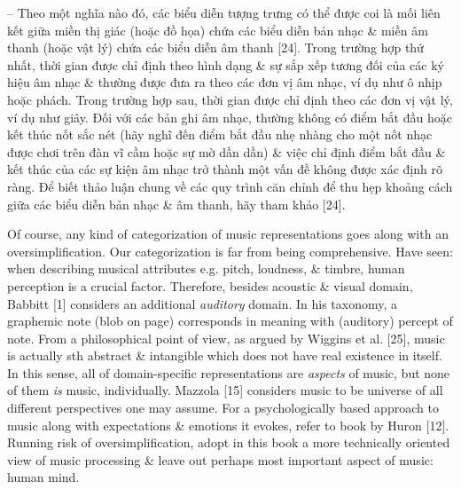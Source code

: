 \documentclass{article}
\begin{document}
\begin{itemize}
\begin{itemize}
		-- Theo một nghĩa nào đó, các biểu diễn tượng trưng có thể được coi là mối liên kết giữa miền thị giác (hoặc đồ họa) chứa các biểu diễn bản nhạc \& miền âm thanh (hoặc vật lý) chứa các biểu diễn âm thanh [24]. Trong trường hợp thứ nhất, thời gian được chỉ định theo hình dạng \& sự sắp xếp tương đối của các ký hiệu âm nhạc \& thường được đưa ra theo các đơn vị âm nhạc, ví dụ như ô nhịp hoặc phách. Trong trường hợp sau, thời gian được chỉ định theo các đơn vị vật lý, ví dụ như giây. Đối với các bản ghi âm nhạc, thường không có điểm bắt đầu hoặc kết thúc nốt sắc nét (hãy nghĩ đến điểm bắt đầu nhẹ nhàng cho một nốt nhạc được chơi trên đàn vĩ cầm hoặc sự mờ dần dần) \& việc chỉ định điểm bắt đầu \& kết thúc của các sự kiện âm nhạc trở thành một vấn đề không được xác định rõ ràng. Để biết thảo luận chung về các quy trình căn chỉnh để thu hẹp khoảng cách giữa các biểu diễn bản nhạc \& âm thanh, hãy tham khảo [24].
		
		Of course, any kind of categorization of music representations goes along with an oversimplification. Our categorization is far from being comprehensive. Have seen: when describing musical attributes e.g. pitch, loudness, \& timbre, human perception is a crucial factor. Therefore, besides acoustic \& visual domain, Babbitt [1] considers an additional {\it auditory} domain. In his taxonomy, a graphemic note (blob on page) corresponds in meaning with (auditory) percept of note. From a philosophical point of view, as argued by Wiggins et al. [25], music is actually sth abstract \& intangible which does not have real existence in itself. In this sense, all of domain-specific representations are {\it aspects} of music, but none of them {\it is} music, individually. Mazzola [15] considers music to be universe of all different perspectives one may assume. For a psychologically based approach to music along with expectations \& emotions it evokes, refer to book by Huron [12]. Running risk of oversimplification, adopt in this book a more technically oriented view of music processing \& leave out perhaps most important aspect of music: human mind.
		

\end{itemize}
\end{itemize}
\end{document}
